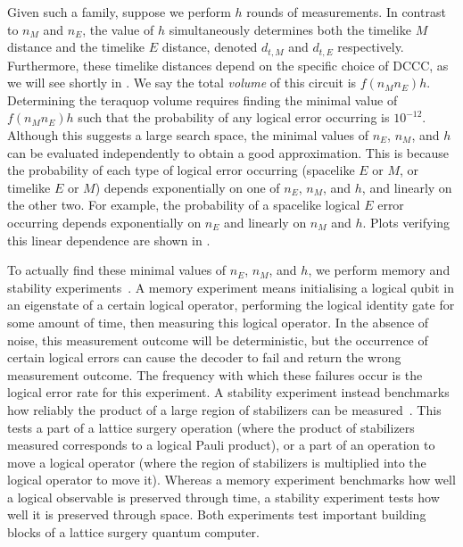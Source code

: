 Given such a family, suppose we perform $h$ rounds of measurements.
In contrast to $n_M$ and $n_E$, the value of $h$ simultaneously determines both the timelike $M$ distance and the timelike $E$ distance, denoted $d_{t,M}$ and $d_{t,E}$ respectively.
Furthermore, these timelike distances depend on the specific choice of DCCC, as we will see shortly in .
We say the total \textit{volume} of this circuit is $f(n_M n_E) h$.
Determining the teraquop volume requires finding the minimal value of $f(n_M n_E) h$ such that the probability of any logical error occurring is $10^{-12}$.
Although this suggests a large search space, the minimal values of $n_E$, $n_M$, and $h$ can be evaluated independently to obtain a good approximation.
This is because the probability of each type of logical error occurring (spacelike $E$ or $M$, or timelike $E$ or $M$) depends exponentially on one of $n_E$, $n_M$, and $h$, and linearly on the other two.
For example, the probability of a spacelike logical $E$ error occurring depends exponentially on $n_E$ and linearly on $n_M$ and $h$.
Plots verifying this linear dependence are shown in .

To actually find these minimal values of $n_E$, $n_M$, and $h$, we perform memory and stability experiments~\cite{gidney2022stability}.
A memory experiment means initialising a logical qubit in an eigenstate of a certain logical operator,
performing the logical identity gate for some amount of time,
then measuring this logical operator.
In the absence of noise, this measurement outcome will be deterministic, but the occurrence of certain logical errors can cause the decoder to fail and return the wrong measurement outcome.
The frequency with which these failures occur is the logical error rate for this experiment.
A stability experiment instead benchmarks how reliably the product of a large region of stabilizers can be measured~\cite{gidney2022stability}.
This tests a part of a lattice surgery operation (where the product of stabilizers measured corresponds to a logical Pauli product), or a part of an operation to move a logical operator (where the region of stabilizers is multiplied into the logical operator to move it).
Whereas a memory experiment benchmarks how well a logical observable is preserved through time, a stability experiment tests how well it is preserved through space.
Both experiments test important building blocks of a lattice surgery quantum computer.


